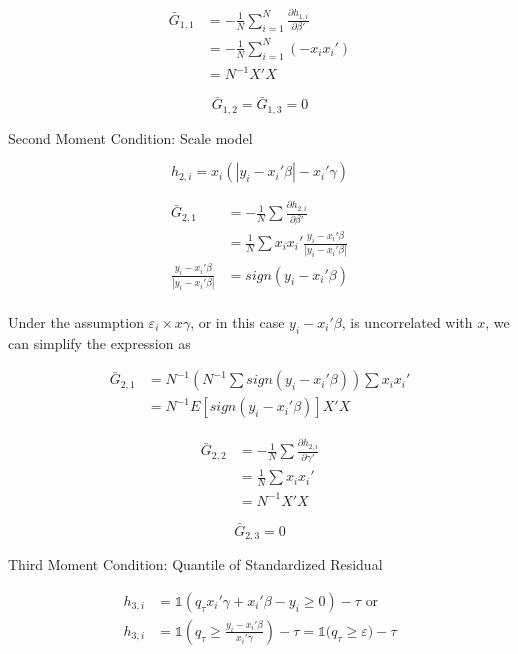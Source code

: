 \documentclass[
  12pt,
  oneside]{article}
\begin{document}
\[\begin{aligned}
\bar G_{1,1} &=- \frac{1}{N} \sum_{i=1}^N \frac{\partial h_{1,i}}{\partial \beta'} \\
             &=- \frac{1}{N} \sum_{i=1}^N (-x_i x_i') \\
             &= N^{-1} X'X
\end{aligned}
\]

\[
\bar G_{1,2} = \bar G_{1,3} = 0
\]

Second Moment Condition: Scale model

\[h_{2,i}=x_i(|y_i-x_i'\beta|-x_i'\gamma)\]

\[\begin{aligned}
\bar G_{2,1} &= -\frac{1}{N} \sum \frac{\partial h_{2,i}}{\partial \beta'} \\
             &=  \frac{1}{N} \sum x_i x_i' \frac{y_i-x_i'\beta}{|y_i-x_i'\beta|} \\
\frac{y_i-x_i'\beta}{|y_i-x_i'\beta|} &= sign(y_i-x_i'\beta) \\            
\end{aligned}
\]

Under the assumption \(\varepsilon_i \times x\gamma\), or in this case
\(y_i-x_i'\beta\), is uncorrelated with \(x\), we can simplify the
expression as

\[\begin{aligned}
\bar G_{2,1} &= N^{-1} \left(N^{-1}\sum sign(y_i-x_i'\beta)\right) \sum x_i x_i' \\
&= N^{-1} E[sign(y_i-x_i'\beta)] X'X
\end{aligned}
\]

\[\begin{aligned}
\bar G_{2,2} &= -\frac{1}{N} \sum \frac{\partial h_{2,i}}{\partial \gamma'} \\
             &=  \frac{1}{N} \sum x_i x_i' \\
             &= N^{-1} X'X
\end{aligned}
\]

\[\bar G_{2,3}=0\]

Third Moment Condition: Quantile of Standardized Residual

\[\begin{aligned}
h_{3,i} &= \mathbb{1}\left( q_\tau  x_i'\gamma +x_i'\beta - y_i \geq 0 \right) - \tau \text{ or}\\
h_{3,i} &= \mathbb{1}\left( q_\tau  \geq \frac{y_i- x_i'\beta}{x_i'\gamma}  \right) - \tau = \mathbb{1}\big( q_\tau \geq \varepsilon  \big) - \tau \\
\end{aligned}
\]
\end{document}
